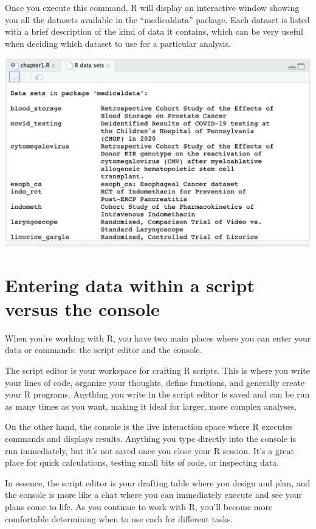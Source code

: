 \documentclass[
  letterpaper,
  DIV=11,
  numbers=noendperiod]{scrreprt}
\begin{document}
Once you execute this command, R will display an interactive window
showing you all the datasets available in the ``medicaldata'' package.
Each dataset is listed with a brief description of the kind of data it
contains, which can be very useful when deciding which dataset to use
for a particular analysis.

\includegraphics{./images/CleanShot 2023-06-12 at 23.00.17@2x.png}

\hypertarget{entering-data-within-a-script-versus-the-console}{%
\section{Entering data within a script versus the
console}\label{entering-data-within-a-script-versus-the-console}}

When you're working with R, you have two main places where you can enter
your data or commands: the script editor and the console.

The script editor is your workspace for crafting R scripts. This is
where you write your lines of code, organize your thoughts, define
functions, and generally create your R programs. Anything you write in
the script editor is saved and can be run as many times as you want,
making it ideal for larger, more complex analyses.

On the other hand, the console is the live interaction space where R
executes commands and displays results. Anything you type directly into
the console is run immediately, but it's not saved once you close your R
session. It's a great place for quick calculations, testing small bits
of code, or inspecting data.

In essence, the script editor is your drafting table where you design
and plan, and the console is more like a chat where you can immediately
execute and see your plans come to life. As you continue to work with R,
you'll become more comfortable determining when to use each for
different tasks.
\end{document}
